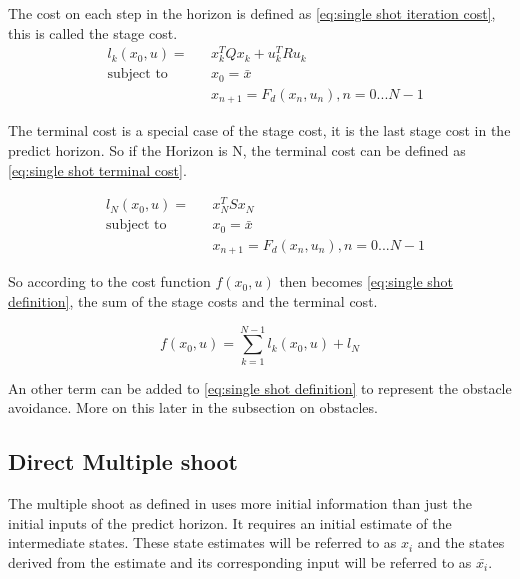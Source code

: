 			The cost on each step in the horizon is defined as \eqref{eq:single shot iteration cost}, this is called the stage cost.
			\begin{equation}
				\begin{aligned}
				& l_k(x_0,u) = &&  x_k^T Q x_k  +  u_k^T R u_k \\
				& \text{subject to}			&& x_0 = \bar{x} \\
				& 							&&  x_{n+1} = F_d(x_n,u_n), n=0...N-1
				\end{aligned}
				\label{eq:single shot iteration cost}
			\end{equation}
			
			The terminal cost is a special case of the stage cost, it is the last stage cost in the predict horizon. So if the Horizon is N, the terminal cost can be defined as \eqref{eq:single shot terminal cost}.
			
			\begin{equation}
				\begin{aligned}
					& l_N(x_0,u) = && x_N^TSx_N \\
					& \text{subject to}			&& x_0 = \bar{x} \\
					& 							&&  x_{n+1} = F_d(x_n,u_n), n=0...N-1
				\end{aligned}
				\label{eq:single shot terminal cost}
			\end{equation}
			
			So according to \cite{Diehl2005} the cost function $f(x_0,u)$ then becomes \eqref{eq:single shot definition}, the sum of the stage costs and the terminal cost.
			
			\begin{equation}
				f(x_0,u) = \sum_{k=1}^{N-1} l_k(x_0,u) + l_N
				\label{eq:single shot definition}
			\end{equation}
			
			An other term can be added to \eqref{eq:single shot definition} to represent the obstacle avoidance. More on this later in the subsection on obstacles.
		\subsection{Direct Multiple shoot}
			The multiple shoot as defined in \cite{Diehl2005} uses more initial information than just the initial inputs of the predict horizon. It requires an initial estimate of the intermediate states. These state estimates will be referred to as $x_i$ and the states derived from the estimate and its corresponding input will be referred to as $\bar{x_i}$. 
			
